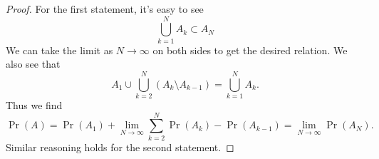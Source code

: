 \begin{proof}
For the first statement, it's easy to see
\begin{equation}
\bigcup^{N}_{k=1}A_{k}\subset A_{N}
\end{equation}
We can take the limit as $N\to\infty$ on both sides to get the desired
relation. We also see that
\begin{equation}
A_{1}\cup\bigcup^{N}_{k=2}(A_{k}\setminus
A_{k-1})=\bigcup^{N}_{k=1}A_{k}.
\end{equation}
Thus we find
\begin{equation}
\Pr(A)=\Pr(A_{1})+\lim_{N\to\infty}\sum^{N}_{k=2}\Pr(A_{k})-\Pr(A_{k-1})=
\lim_{N\to\infty}\Pr(A_{N}).
\end{equation}
Similar reasoning holds for the second statement.
\end{proof}
